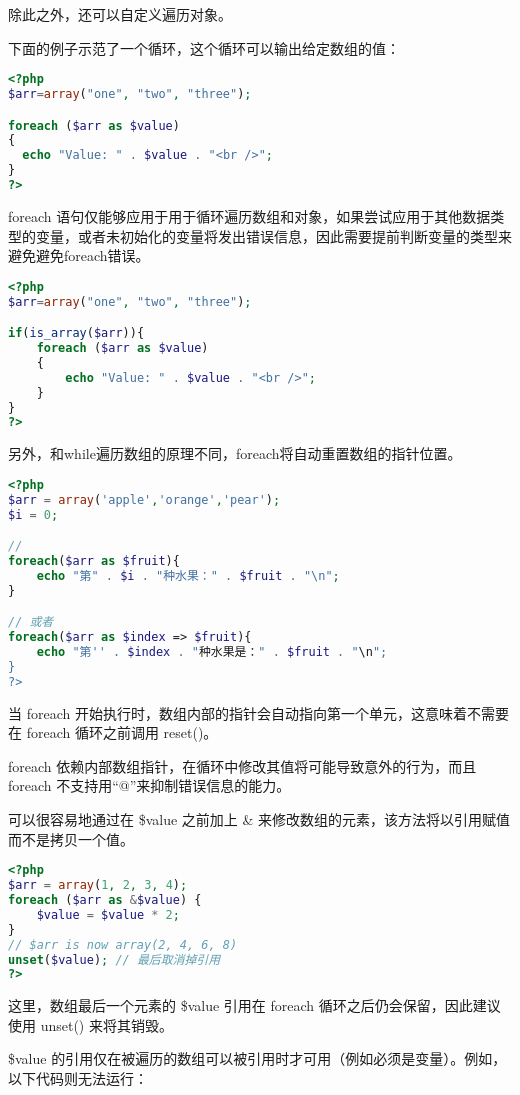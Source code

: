 除此之外，还可以自定义遍历对象。



下面的例子示范了一个循环，这个循环可以输出给定数组的值：

\begin{lstlisting}[language=PHP]
<?php
$arr=array("one", "two", "three");

foreach ($arr as $value)
{
  echo "Value: " . $value . "<br />";
}
?>
\end{lstlisting}

foreach 语句仅能够应用于用于循环遍历数组和对象，如果尝试应用于其他数据类型的变量，或者未初始化的变量将发出错误信息，因此需要提前判断变量的类型来避免避免foreach错误。

\begin{lstlisting}[language=PHP]
<?php
$arr=array("one", "two", "three");

if(is_array($arr)){
	foreach ($arr as $value)
	{
		echo "Value: " . $value . "<br />";
	}
}
?>
\end{lstlisting}


另外，和while遍历数组的原理不同，foreach将自动重置数组的指针位置。

\begin{lstlisting}[language=PHP]
<?php
$arr = array('apple','orange','pear');
$i = 0;

// 
foreach($arr as $fruit){
	echo "第" . $i . "种水果：" . $fruit . "\n";
}

// 或者
foreach($arr as $index => $fruit){
	echo "第'' . $index . "种水果是：" . $fruit . "\n";
}
?>
\end{lstlisting}


当 foreach 开始执行时，数组内部的指针会自动指向第一个单元，这意味着不需要在 foreach 循环之前调用 reset()。

foreach 依赖内部数组指针，在循环中修改其值将可能导致意外的行为，而且foreach 不支持用“@”来抑制错误信息的能力。


可以很容易地通过在 \$value 之前加上 \& 来修改数组的元素，该方法将以引用赋值而不是拷贝一个值。


\begin{lstlisting}[language=PHP]
<?php
$arr = array(1, 2, 3, 4);
foreach ($arr as &$value) {
    $value = $value * 2;
}
// $arr is now array(2, 4, 6, 8)
unset($value); // 最后取消掉引用
?>
\end{lstlisting}

这里，数组最后一个元素的 \$value 引用在 foreach 循环之后仍会保留，因此建议使用 unset() 来将其销毁。

\$value 的引用仅在被遍历的数组可以被引用时才可用（例如必须是变量）。例如，以下代码则无法运行：



